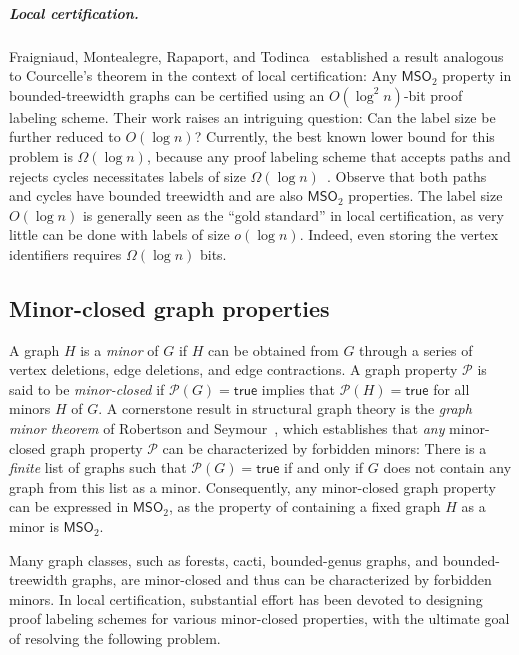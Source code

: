 \documentclass[11pt]{article}
\theoremstyle{definition}
\theoremstyle{remark}
\newcommand{\true}{\mathsf{true}}
\newcommand{\MSO}{\mathsf{MSO}_2}
\begin{document}
\subparagraph{Local certification.}
Fraigniaud, Montealegre, Rapaport, and Todinca~\cite{fraigniaud2024meta}  established a result analogous to Courcelle's theorem in the context of local certification: Any $\MSO$ property in bounded-treewidth graphs can be certified using an $O(\log^2 n)$-bit proof labeling scheme. Their work raises an intriguing question: Can the label size be further reduced to $O(\log n)$? Currently, the best known lower bound for this problem is $\Omega(\log n)$, because any proof labeling scheme that accepts paths and rejects cycles necessitates labels of size $\Omega(\log n)$~\cite{korman03032010}. Observe that both paths and cycles have bounded treewidth and are also $\MSO$ properties. The label size $O(\log n)$ is generally seen as the ``gold standard'' in local certification, as very little can be done with labels of size $o(\log n)$. Indeed, even storing the vertex identifiers requires $\Omega(\log n)$ bits.


\subsection{Minor-closed graph properties}
A graph $H$ is a \emph{minor} of $G$ if $H$ can be obtained from $G$ through a series of vertex deletions, edge deletions, and edge contractions. 
 A graph property $\mathcal{P}$ is said to be \emph{minor-closed} if $\mathcal{P}(G)=\true$ implies that  $\mathcal{P}(H)=\true$ for all minors $H$ of $G$. 
  A cornerstone result in structural graph theory is the \emph{graph minor theorem} of Robertson and Seymour~\cite{ROBERTSON2004325}, which establishes that \emph{any}  minor-closed graph property $\mathcal{P}$ can be characterized by forbidden minors: There is a \emph{finite} list of graphs such that $\mathcal{P}(G)=\true$  if and only if $G$ does not contain any graph from this list as a minor. Consequently, any minor-closed graph property can be expressed in $\MSO$, as the property of containing a fixed graph $H$ as a minor is $\MSO$.

Many graph classes, such as forests, cacti, bounded-genus graphs, and bounded-treewidth graphs, are minor-closed and thus can be characterized by forbidden minors. In local certification, substantial effort has been devoted to designing proof labeling schemes for various minor-closed properties, with the ultimate goal of resolving the following problem.
\end{document}
